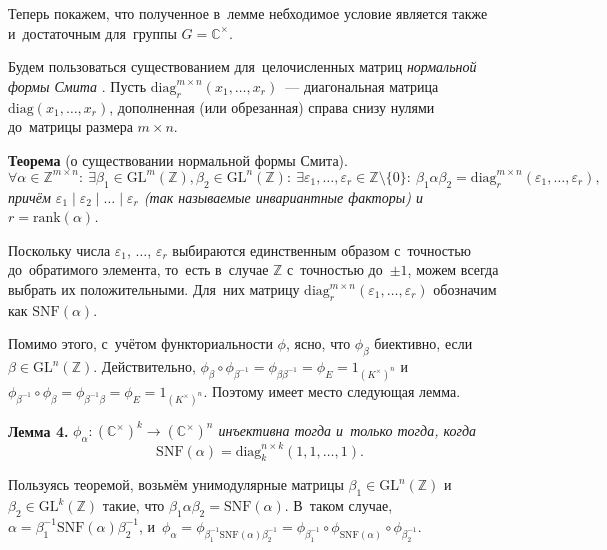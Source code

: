 \documentclass[twoside]{article}
\begin{document}
Теперь покажем, что полученное в~лемме небходимое условие является также и~достаточным для~группы $G = {\mathbb{C}^\times}$.

Будем пользоваться существованием для~целочисленных матриц \textit{нормальной формы Смита} \cite{Smth60}.
Пусть $\mathrm{diag}^{m \times n}_r(x_1, \ldots, x_r)$~— диагональная матрица $\mathrm{diag}(x_1, \ldots, x_r)$,
дополненная (или обрезанная) справа снизу нулями до~матрицы размера $m \times n$.

\medskip\noindent\textbf{Теорема} (о существовании нормальной формы Смита).\emph{
    $$
        \forall \alpha \in \mathbb{Z}^{m \times n}{:}\
        \exists \beta_1 \in \mathrm{GL}^m(\mathbb{Z}), \beta_2 \in \mathrm{GL}^n(\mathbb{Z}){:} \
        \exists \varepsilon_1, \ldots, \varepsilon_r \in \mathbb{Z} \setminus \{0\}{:} \
        \beta_1 \alpha \beta_2 = \mathrm{diag}^{m \times n}_r(\varepsilon_1, \ldots, \varepsilon_r),
    $$
    причём $\varepsilon_1 \mid \varepsilon_2 \mid \ldots \mid \varepsilon_r$ (так называемые инвариантные факторы) и~$r = \mathrm{rank}(\alpha)$.
}\medskip

Поскольку числа $\varepsilon_1$, $\ldots$, $\varepsilon_r$ выбираются единственным образом с~точностью
до~обратимого элемента, то~есть в~случае $\mathbb{Z}$ с~точностью до~$\pm 1$, можем всегда выбрать их положительными.
Для~них матрицу $\mathrm{diag}^{m \times n}_r(\varepsilon_1, \ldots, \varepsilon_r)$ обозначим как $\mathrm{SNF}(\alpha)$.

Помимо этого, с~учётом функториальности $\phi$, ясно, что $\phi_\beta$ биективно, если $\beta \in \mathrm{GL}^n(\mathbb{Z})$.
Действительно, $\phi_\beta \circ \phi_{\beta^{-1}} = \phi_{\beta \beta^{-1}} = \phi_E = 1_{(K^\times)^n}$
и~$\phi_{\beta^{-1}} \circ \phi_\beta = \phi_{\beta^{-1} \beta} = \phi_E = 1_{(K^\times)^n}$.
Поэтому имеет место следующая лемма.

\medskip\noindent\textbf{Лемма 4.}\emph{
    $\phi_\alpha : (\mathbb{C}^\times)^k \rightarrow (\mathbb{C}^\times)^n$ инъективна тогда и~только тогда, когда
    $$
        \mathrm{SNF}(\alpha) = \mathrm{diag}^{n \times k}_k(1, 1, \ldots, 1).
    $$
}

    Пользуясь теоремой, возьмём унимодулярные матрицы $\beta_1 \in \mathrm{GL}^n(\mathbb{Z})$ и~$\beta_2 \in \mathrm{GL}^k(\mathbb{Z})$
    такие, что $\beta_1 \alpha \beta_2 = \mathrm{SNF}(\alpha)$.
    В~таком случае, $\alpha = \beta_1^{-1} \mathrm{SNF}(\alpha) \beta_2^{-1}$, и~$\phi_\alpha = \phi_{\beta_1^{-1} \mathrm{SNF}(\alpha) \beta_2^{-1}}
                                                                                              = \phi_{\beta_1^{-1}} \circ \phi_{\mathrm{SNF}(\alpha)} \circ \phi_{\beta_2^{-1}}$.
\end{document}
